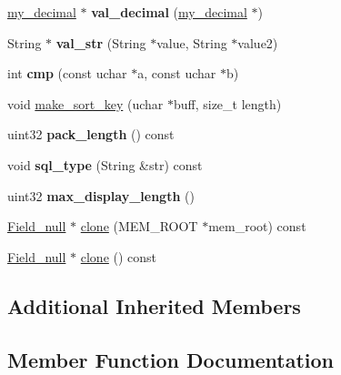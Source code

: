 \begin{DoxyCompactItemize}
\mbox{\label{classField__null_a15523c2c699e6d3a9a115192bfe2df89}} 
\mbox{\hyperlink{classmy__decimal}{my\+\_\+decimal}} $\ast$ {\bfseries val\+\_\+decimal} (\mbox{\hyperlink{classmy__decimal}{my\+\_\+decimal}} $\ast$)
\item 
\mbox{\label{classField__null_aa867ff3ff6c5dc9cac08026437eda5c1}} 
String $\ast$ {\bfseries val\+\_\+str} (String $\ast$value, String $\ast$value2)
\item 
\mbox{\label{classField__null_a4102de50df0f3157f0d8ba01f0ab9894}} 
int {\bfseries cmp} (const uchar $\ast$a, const uchar $\ast$b)
\item 
void \mbox{\hyperlink{classField__null_a0884e171c5d4b91b3caca8c183623668}{make\+\_\+sort\+\_\+key}} (uchar $\ast$buff, size\+\_\+t length)
\item 
\mbox{\label{classField__null_a30dbbe27ac7aa9a4bf6a8db8bc80d538}} 
uint32 {\bfseries pack\+\_\+length} () const
\item 
\mbox{\label{classField__null_afe39dee1b9578bf8e9819b8680e25124}} 
void {\bfseries sql\+\_\+type} (String \&str) const
\item 
\mbox{\label{classField__null_a79e0a2c658362be334f0976ee3a39ee7}} 
uint32 {\bfseries max\+\_\+display\+\_\+length} ()
\item 
\mbox{\hyperlink{classField__null}{Field\+\_\+null}} $\ast$ \mbox{\hyperlink{classField__null_a75db09e0a72ed750e8529e5ce74bee52}{clone}} (M\+E\+M\+\_\+\+R\+O\+OT $\ast$mem\+\_\+root) const
\item 
\mbox{\hyperlink{classField__null}{Field\+\_\+null}} $\ast$ \mbox{\hyperlink{classField__null_a02b58c0585abc836acfe7b7a1bec8d61}{clone}} () const
\end{DoxyCompactItemize}
\subsection*{Additional Inherited Members}


\subsection{Member Function Documentation}
\mbox{\label{classField__null_a75db09e0a72ed750e8529e5ce74bee52}} 
